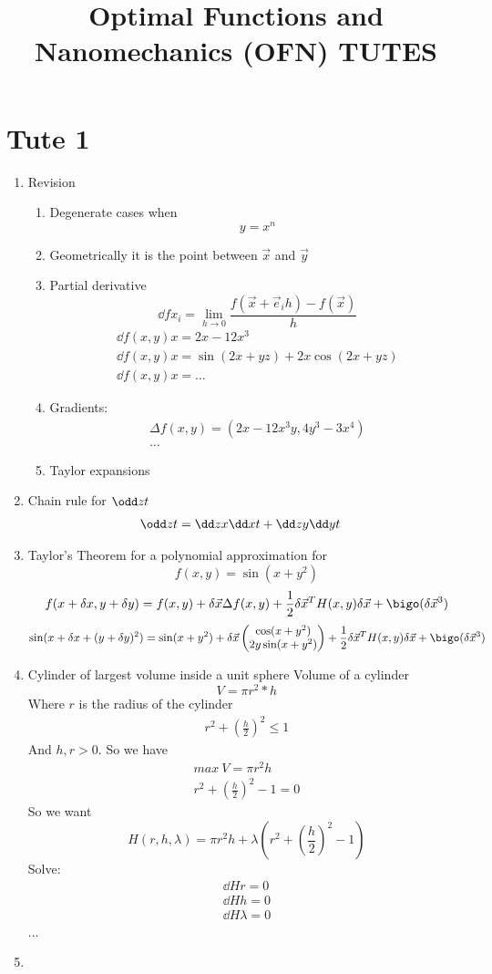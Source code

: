 \documentclass{E:/Documents/Latex/myassignment}
\title{Optimal Functions and Nanomechanics (OFN) TUTES}
\begin{document}
\section{Tute 1}
\begin{enumerate}
\item Revision
	\begin{enumerate}
			\item Degenerate cases when 
		\[y=x^n\]
		\item Geometrically it is the point between $\vec x$ and $\vec y$
		\item Partial derivative
		\[\dd f{x_i} = \lim_{h\to 0 } \frac{f(\vec x + \vec e_i h) - f(\vec x)}{h}\]
		\begin{align*}
			\dd{f(x,y)}{x} = 2x - 12x^3\\
			\dd{f(x,y)}{x} = \sin(2x+yz) + 2x\cos(2x+yz)\\
			\dd{f(x,y)}{x} = \ldots
		\end{align*}
		\item Gradients:
		\begin{align*}
			\Delta f(x,y) = \left(2x-12x^3y, 4y^3 - 3x^4\right)\\
			\ldots
		\end{align*}
		\item Taylor expansions
	\end{enumerate}
	\item Chain rule for $\odd zt$
	\begin{align*}
		\odd zt &= \dd zx \dd xt + \dd zy \dd yt
	\end{align*}
	\item Taylor's Theorem for a polynomial approximation for 
	\[f(x,y) = \sin(x+y^2)\]
	\[f(x+\delta x, y+ \delta y) = f(x,y) + \delta \vec x \Delta f(x,y) + \frac12 \delta \vec x^T H(x,y) \delta \vec x + \bigo(\delta \vec x ^3)\]
	\[\sin(x+\delta x+(y+\delta y)^2) = \sin(x+y^2) + \delta \vec x \begin{pmatrix}
		\cos(x+y^2)\\
		2y\sin(x+y^2)
	\end{pmatrix} + \frac12 \delta \vec x^T H(x,y) \delta \vec x + \bigo(\delta \vec x ^3)\]
	\item Cylinder of largest volume inside a unit sphere
	Volume of a cylinder 
	\[V = \pi r^2 * h\]
	Where $r$ is the radius of the cylinder
	\begin{align*}
		r^2 + \left(\frac{h}{2}\right)^2 \leq 1
	\end{align*}
	And $h,r > 0$.
	So we have
	\begin{align*}
		max \ V = \pi r^2h\\
		r^2 + \left(\frac{h}{2}\right)^2 -1 =0
	\end{align*}
	So we want
	\[H(r,h,\lambda) = \pi r^2 h + \lambda \left(r^2 + \left(\frac{h}{2}\right)^2 -1\right)\]
	Solve:
	\begin{align*}
	 \dd H r = 0 \\
	 \dd H h = 0\\
	 \dd H \lambda = 0	
	 \end{align*} ...

	 

	 \item 
\end{enumerate}
\end{document}
